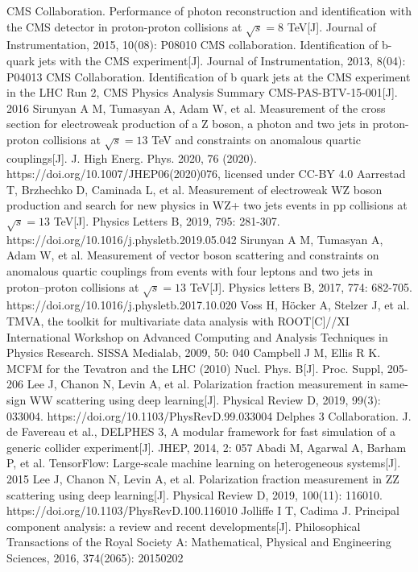 \documentclass{SCIS2020cn}
\begin{document}
\begin{thebibliography}{99}
 CMS Collaboration. Performance of photon reconstruction and identification with the CMS detector in proton-proton collisions at $\sqrt {s} = 8 $ TeV[J]. Journal of Instrumentation, 2015, 10(08): P08010
 CMS collaboration. Identification of b-quark jets with the CMS experiment[J]. Journal of Instrumentation, 2013, 8(04): P04013
 CMS Collaboration. Identification of b quark jets at the CMS experiment in the LHC Run 2, CMS Physics Analysis Summary CMS-PAS-BTV-15-001[J]. 2016
 Sirunyan A M, Tumasyan A, Adam W, et al. Measurement of the cross section for electroweak production of a Z boson, a photon and two jets in proton-proton collisions at $\sqrt {s} = 13 $ TeV and constraints on anomalous quartic couplings[J].  J. High Energ. Phys. 2020, 76 (2020). https://doi.org/10.1007/JHEP06(2020)076, licensed under CC-BY 4.0
 Aarrestad T, Brzhechko D, Caminada L, et al. Measurement of electroweak WZ boson production and search for new physics in WZ+ two jets events in pp collisions at $\sqrt {s}= 13$ TeV[J]. Physics Letters B, 2019, 795: 281-307. https://doi.org/10.1016/j.physletb.2019.05.042
 Sirunyan A M, Tumasyan A, Adam W, et al. Measurement of vector boson scattering and constraints on anomalous quartic couplings from events with four leptons and two jets in proton–proton collisions at $\sqrt {s} = 13 $ TeV[J]. Physics letters B, 2017, 774: 682-705. https://doi.org/10.1016/j.physletb.2017.10.020
 Voss H, Höcker A, Stelzer J, et al. TMVA, the toolkit for multivariate data analysis with ROOT[C]//XI International Workshop on Advanced Computing and Analysis Techniques in Physics Research. SISSA Medialab, 2009, 50: 040
 Campbell J M, Ellis R K. MCFM for the Tevatron and the LHC (2010) Nucl. Phys. B[J]. Proc. Suppl, 205-206
 Lee J, Chanon N, Levin A, et al. Polarization fraction measurement in same-sign WW scattering using deep learning[J]. Physical Review D, 2019, 99(3): 033004. https://doi.org/10.1103/PhysRevD.99.033004
 Delphes 3 Collaboration. J. de Favereau et al., DELPHES 3, A modular framework for fast simulation of a generic collider experiment[J]. JHEP, 2014, 2: 057
 Abadi M, Agarwal A, Barham P, et al. TensorFlow: Large-scale machine learning on heterogeneous systems[J]. 2015
 Lee J, Chanon N, Levin A, et al. Polarization fraction measurement in ZZ scattering using deep learning[J]. Physical Review D, 2019, 100(11): 116010. https://doi.org/10.1103/PhysRevD.100.116010
 Jolliffe I T, Cadima J. Principal component analysis: a review and recent developments[J]. Philosophical Transactions of the Royal Society A: Mathematical, Physical and Engineering Sciences, 2016, 374(2065): 20150202

\end{thebibliography}
\end{document}
